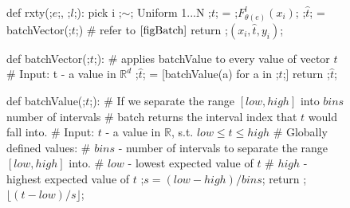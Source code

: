 \documentclass[dissertation.tex]{subfiles}
\begin{document}
\begin{figure}[H]
    \begin{pythonfigure}
      def rxty(;$e$;, ;$l$;):
        pick i ;$\sim$; Uniform {1...N}
        ;$t$; = ;$F_{\theta(e)}^l(x_i)$;
        ;$\hat{t}$; = batchVector(;$t$;) # refer to $\autoref{figBatch}$
        return ;$(x_i, \hat{t}, y_i)$;
    \end{pythonfigure}
    \caption{
    }
    \label{figRxtyBinning}
\end{figure}

\begin{figure}[H]
    \begin{pythonfigure}
      def batchVector(;$t$;): 
        # applies batchValue to every value of vector $t$
        # Input: t - a value in $\mathbb{R}^d$
        ;$\hat{t}$; = [batchValue(a) for a in ;$t$;]
        return ;$\hat{t}$;

      def batchValue(;$t$;):
        # If we separate the range $[low, high]$ into $bins$ number of intervals 
        # batch returns the interval index that $t$ would fall into.
        # Input: $t$ - a value in $\mathbb{R}$, s.t. $low\leq{t}\leq{high}$
        # Globally defined values:
        # $bins$  - number of intervals to separate the range $[low, high]$ into.
        # $low$   - lowest  expected value of $t$
        # $high$  - highest expected value of $t$
        ;$s = (low - high) / bins$;
        return ;$\lfloor{(t - low)/s}\rfloor$;
    \end{pythonfigure}
    \caption{
    }
    \label{figBatch}
\end{figure}

\newpage
\end{document}
